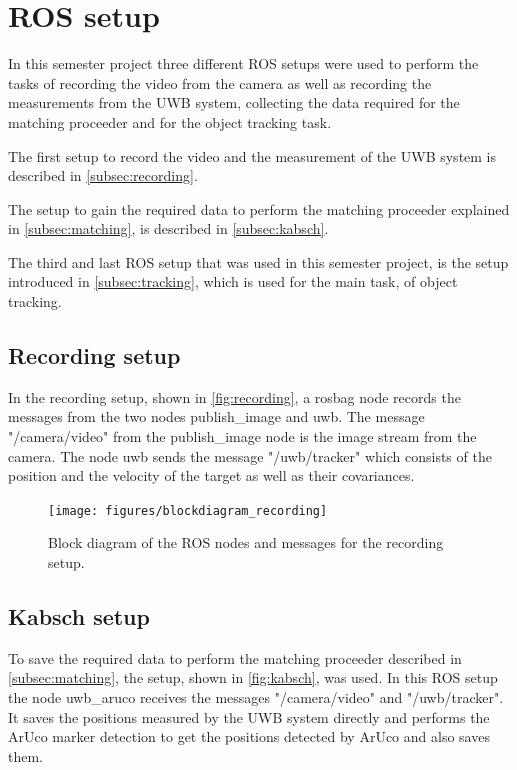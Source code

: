 \section{ROS setup}
In this semester project three different ROS setups were used to perform the tasks of recording the video from the camera as well as recording the measurements from the UWB system, collecting the data required for the matching proceeder and for the object tracking task.

The first setup to record the video and the measurement of the UWB system is described in \autoref{subsec:recording}.

The setup to gain the required data to perform the matching proceeder explained in \autoref{subsec:matching}, is described in \autoref{subsec:kabsch}.

The third and last ROS setup that was used in this semester project, is the setup introduced in \autoref{subsec:tracking}, which is used for the main task, of object tracking.

\subsection{Recording setup}\label{subsec:recording}
In the recording setup, shown in \autoref{fig:recording}, a rosbag node records the messages from the two nodes publish\_image and uwb. The message "/camera/video" from the publish\_image node is the image stream from the camera. The node uwb sends the message "/uwb/tracker" which consists of the position and the velocity of the target as well as their covariances.

\begin{figure}[h]\centering
	\texttt{[image: figures/blockdiagram\_recording]}
	\caption{Block diagram of the ROS nodes and messages for the recording setup.}\label{fig:recording}
\end{figure}

\subsection{Kabsch setup}\label{subsec:kabsch}
To save the required data to perform the matching proceeder described in \autoref{subsec:matching}, the setup, shown in \autoref{fig:kabsch}, was used. In this ROS setup the node uwb\_aruco receives the messages "/camera/video" and "/uwb/tracker". It saves the positions measured by the UWB system directly and performs the ArUco marker detection to get the positions detected by ArUco and also saves them.

